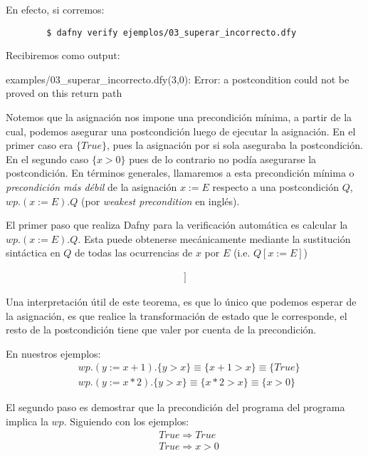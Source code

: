 \documentclass[12pt, a4paper, openany, fleqn]{book}
\begin{document}
    En efecto, si corremos:
    \begin{verbatim}
        $ dafny verify ejemplos/03_superar_incorrecto.dfy
    \end{verbatim}
    Recibiremos como output:
    \begin{spverbatim}
    examples/03_superar_incorrecto.dfy(3,0): Error: a postcondition could not be proved on this return path
    \end{spverbatim}

    Notemos que la asignación nos impone una precondición mínima, a partir de la cual, podemos asegurar una postcondición luego de ejecutar la asignación. En el primer caso era $\{True\}$, pues la asignación por si sola aseguraba la postcondición. En el segundo caso $\{ x > 0 \}$ pues de lo contrario no podía asegurarse la postcondición.
    En términos generales, llamaremos a esta precondición mínima o \textit{precondición más débil} de la asignación $x:=E$ respecto a una postcondición $Q$, $wp.(x := E).Q$ (por \textit{weakest precondition} en inglés).

    El primer paso que realiza Dafny para la verificación automática es calcular la $wp.(x := E).Q$.
    Esta puede obtenerse mecánicamente mediante la sustitución sintáctica en $Q$ de todas las ocurrencias de $x$ por $E$ (i.e. $Q[x := E]$)

    \begin{align*}
        [ wp.(x:=E).Q \equiv Q[x:=E] ]
    \end{align*}

    Una interpretación útil de este teorema, es que lo único que podemos esperar de la asignación, es que realice la transformación de estado que le corresponde, el resto de la postcondición tiene que valer por cuenta de la precondición.

    En nuestros ejemplos:
    \begin{align*}
        & wp.(y := x + 1).\{ y > x \} \equiv \{ x + 1 > x \} \equiv \{ True \} \\
        & wp.(y := x * 2).\{ y > x \} \equiv \{ x * 2 > x \} \equiv \{ x > 0 \}
    \end{align*}


    El segundo paso es demostrar que la precondición del programa del programa implica la $wp$.
    Siguiendo con los ejemplos:
    \begin{align*}
        & True \Rightarrow True \\
        & True \Rightarrow x > 0
    \end{align*}
\end{document}
